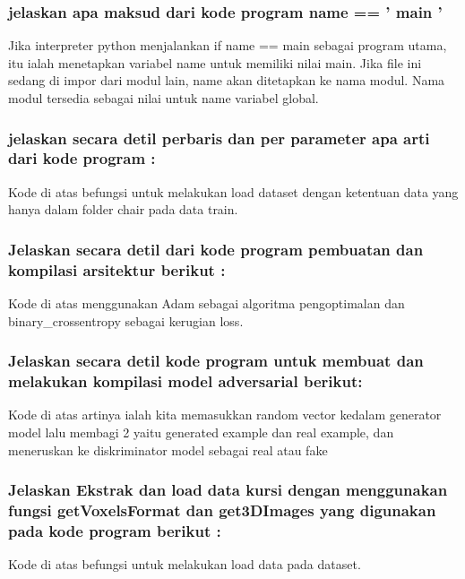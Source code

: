 \subsubsection{jelaskan apa maksud dari kode program name == ' main '}
\hfill\break

Jika interpreter python menjalankan if name == main sebagai program utama, itu ialah menetapkan variabel name untuk memiliki nilai main. Jika file ini sedang di impor dari modul lain, name akan ditetapkan ke nama modul. Nama modul tersedia sebagai nilai untuk name variabel global.

\subsubsection{jelaskan secara detil perbaris dan per parameter apa arti dari kode program :}
\hfill\break

Kode di atas befungsi untuk melakukan load dataset dengan ketentuan data yang hanya dalam folder chair pada data train.

\subsubsection{Jelaskan secara detil dari kode program pembuatan dan kompilasi arsitektur berikut :}
\hfill\break

Kode di atas menggunakan Adam sebagai algoritma pengoptimalan dan binary\_crossentropy sebagai kerugian loss. 

\subsubsection{Jelaskan secara detil kode program untuk membuat dan melakukan kompilasi model adversarial berikut:}
\hfill\break

Kode di atas artinya ialah kita memasukkan random vector kedalam generator model lalu membagi 2 yaitu generated example dan real example, dan meneruskan ke diskriminator model sebagai real atau fake

\subsubsection{Jelaskan Ekstrak dan load data kursi dengan menggunakan fungsi getVoxelsFormat dan get3DImages yang digunakan pada kode program berikut :}
\hfill\break

Kode di atas befungsi untuk melakukan load data pada dataset.

